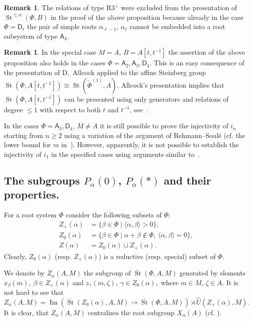 \documentclass[oneside, 8pt]{amsart}
\theoremstyle{remark}
\theoremstyle{definition}
\numberwithin{lemma}{section}
\numberwithin{prop}{section}
\numberwithin{corollary}{section}
\numberwithin{externaltheorem}{section}
\newtheorem{rem}[lemma]{Remark}
\DeclareMathOperator{\Img}{Im}
\DeclareMathOperator{\St}{St}
\newcommand{\inv}{^{-1}}
\newcommand{\rA}{\mathsf{A}}
\newcommand{\rD}{\mathsf{D}}
\numberwithin{equation}{section}
\begin{document}
\begin{rem}
 The relations of type $\text{R3}^\bot$ were excluded from the presentation of $\St^{\leq n}(\Phi, B)$ in the proof of the above proposition because already in the case $\Phi=\rD_\ell$ the pair of simple roots $\alpha_{\ell-1}$, $\alpha_{\ell}$ cannot be embedded into a root subsystem of type $\rA_4$.
\end{rem}
\begin{rem}
 In the special case $M=A$, $B = A[t, t\inv]$ the assertion of the above proposition also holds in the cases $\Phi=\rA_2, \rA_3, \rD_4$. This is an easy consequence of the presentation of D.~Allcock applied to the affine Steinberg group $\St(\Phi, A[t, t\inv]) \cong \St(\widetilde{\Phi}^{(1)}, A)$. Allcock's presentation implies that $\St(\Phi, A[t, t\inv])$ can be presented using only generators and relations of degree $\leq 1$ with respect to both $t$ and $t^{-1}$, see~\cite[Corollary~1.3]{A13}.
 
 In the cases $\Phi = \rA_3, \rD_4$, $M \neq A$ it is still possible to prove the injectivity of $i_n$ starting from $n\geq 2$ using a variation of the argument of Rehmann--Soul{\'e} (cf. the lower bound for $m$ in~\cite[3.2.1]{RS76}). However, apparently, it is not possible to establish the injectivity of $i_1$ in the specified cases using arguments similar to~\cite{RS76}.
\end{rem}

\subsection{The subgroups $P_\alpha(0)$, $P_\alpha(*)$ and their properties.} \label{sec:Pa0-basic}
For a root system $\Phi$ consider the following subsets of $\Phi$:
\begin{align} Z_+(\alpha) & = \{ \beta \in \Phi \mid \langle \alpha, \beta \rangle > 0 \}, \\
   Z_0(\alpha) & = \{ \beta \in \Phi \mid \alpha + \beta \not\in \Phi,\ \langle \alpha, \beta \rangle = 0 \}, \\
   Z(\alpha)   & = Z_0(\alpha) \sqcup Z_+(\alpha). \end{align} 
Clearly, $Z_0(\alpha)$ (resp. $Z_+(\alpha)$) is a reductive (resp. special) subset of $\Phi$.
   
We denote by $Z_\alpha(A, M)$ the subgroup of $\overline{\St}(\Phi, A, M)$ generated by elements
 $x_{\beta}(m),\ \beta \in Z_+(\alpha)$ and $z_{\gamma}(m, \zeta),\ \gamma \in Z_0(\alpha),$ where $m \in M$, $\zeta \in A$.
It is not hard to see that \[Z_\alpha(A, M) = \Img\left(\overline{\St}(Z_0(\alpha), A, M) \to \overline{\St}(\Phi, A, M)\right) \rtimes \hat{U}(Z_+(\alpha), M). \]
It is clear, that $Z_\alpha(A, M)$ centralizes the root subgroup $X_\alpha(A)$ (cf. \cite[984]{St71}).
\end{document}
